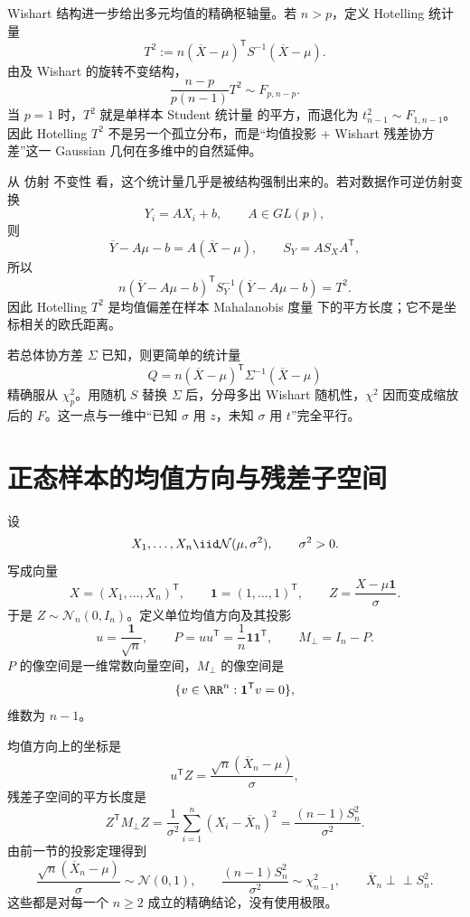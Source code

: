 Wishart 结构进一步给出多元均值的精确枢轴量。若 $n>p$，定义 Hotelling 统计量
\begin{equation*}T^2
:=n(\overline X-\mu)^{\mathsf T}S^{-1}(\overline X-\mu).\end{equation*}
由及 Wishart 的旋转不变结构，
\begin{equation}
\boxed{
\frac{n-p}{p(n-1)}T^2
\sim F_{p,n-p}.
}
\label{eq:math-stat-hotelling-f}
\end{equation}
当 $p=1$ 时，$T^2$ 就是单样本 Student 统计量 的平方，而退化为 $t_{n-1}^2\sim F_{1,n-1}$。因此 Hotelling $T^2$ 不是另一个孤立分布，而是“均值投影 + Wishart 残差协方差”这一 Gaussian 几何在多维中的自然延伸。

从 仿射 不变性 看，这个统计量几乎是被结构强制出来的。若对数据作可逆仿射变换
\[
Y_i=AX_i+b,
\qquad A\in GL(p),
\]
则
\[
\overline Y-A\mu-b=A(\overline X-\mu),
\qquad
S_Y=AS_XA^{\mathsf T},
\]
所以
\[
n(\overline Y-A\mu-b)^{\mathsf T}
S_Y^{-1}
(\overline Y-A\mu-b)
=T^2.
\]
因此 Hotelling $T^2$ 是均值偏差在样本 Mahalanobis 度量 下的平方长度；它不是坐标相关的欧氏距离。

若总体协方差 $\Sigma$ 已知，则更简单的统计量
\[
Q=n(\overline X-\mu)^{\mathsf T}
\Sigma^{-1}(\overline X-\mu)
\]
精确服从 $\chi^2_p$。用随机 $S$ 替换 $\Sigma$ 后，分母多出 Wishart 随机性，$\chi^2$ 因而变成缩放后的 $F$。这一点与一维中“已知 $\sigma$ 用 $z$，未知 $\sigma$ 用 $t$”完全平行。

\section{正态样本的均值方向与残差子空间}

设
\[
 X_1,\ldots,X_n\iid\mathcal N(\mu,\sigma^2),
 \qquad \sigma^2>0.
\]
写成向量
\[
 X=(X_1,\ldots,X_n)^{\mathsf T},
 \qquad
 \mathbf1=(1,\ldots,1)^{\mathsf T},
 \qquad
 Z=\frac{X-\mu\mathbf1}{\sigma}.
\]
于是 $Z\sim\mathcal N_n(0,I_n)$。定义单位均值方向及其投影
\[
 u=\frac{\mathbf1}{\sqrt n},
 \qquad
 P=uu^{\mathsf T}=\frac1n\mathbf1\mathbf1^{\mathsf T},
 \qquad
 M_\perp=I_n-P.
\]
$P$ 的像空间是一维常数向量空间，$M_\perp$ 的像空间是
\[
 \{v\in\RR^n:\mathbf1^{\mathsf T}v=0\},
\]
维数为 $n-1$。

均值方向上的坐标是
\[
 u^{\mathsf T}Z
 =\frac{\sqrt n(\overline X_n-\mu)}{\sigma},
\]
残差子空间的平方长度是
\[
 Z^{\mathsf T}M_\perp Z
 =\frac1{\sigma^2}\sum_{i=1}^n(X_i-\overline X_n)^2
 =\frac{(n-1)S_n^2}{\sigma^2}.
\]
由前一节的投影定理得到
\begin{equation}\label{eq:math-stat-normal-mean-variance-independence}
 \frac{\sqrt n(\overline X_n-\mu)}{\sigma}\sim\mathcal N(0,1),
 \qquad
 \frac{(n-1)S_n^2}{\sigma^2}\sim\chi^2_{n-1},
 \qquad
 \overline X_n\mathrel{\perp\!\!\!\perp}S_n^2.
\end{equation}
这些都是对每一个 $n\ge2$ 成立的精确结论，没有使用极限。

